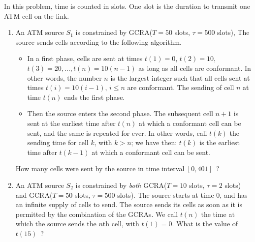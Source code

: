 \begin{problem}
In this problem, time is counted in slots. One slot is the duration to transmit
one ATM cell on the link.

\begin{enumerate}
        \item An ATM source $S_{1}$ is constrained by GCRA($T=50$ slots,
        $\tau=500$ slots), The source sends cells according to the
        following algorithm.
\begin{itemize}
        \item In a first phase, cells are sent at times $t(1)=0$,
        $t(2)=10$, $t(3)=20, \ldots,t(n)= 10(n-1)$ as long as all cells
        are conformant.  In other words, the number $n$ is the largest
        integer such that all cells sent at times $t(i)=10(i-1)$, $i\leq
        n$ are conformant. The sending of  cell $n$ at time $t(n)$ ends
        the first phase.

        \item  Then the source enters the second phase. The subsequent cell
        $n+1$ is sent at the earliest time after
        $t(n)$ at which a conformant cell can be sent, and the same is
        repeated for ever. In other words, call $t(k)$ the sending time for
        cell $k$, with $k>n$; we have then: $t(k)$ is the earliest time after
        $t(k-1)$ at which a conformant cell can be sent.
\end{itemize}

How many cells were sent by the source in time interval $[0, 401]$~?


        \item An ATM source $S_{2}$ is constrained by \emph{both}
        GCRA($T=10$ slots, $\tau=2$ slots) and GCRA($T=50$ slots,
        $\tau=500$ slots).  The source starts at time $0$, and has an
        infinite supply of cells to send.  The source sends its cells as
        soon as it is permitted by the combination of the GCRAs.  We call
        $t(n)$ the time at which the source sends the $n$th cell, with
        $t(1)=0$. What is the value of $t(15)$~?

\end{enumerate}
\end{problem}
